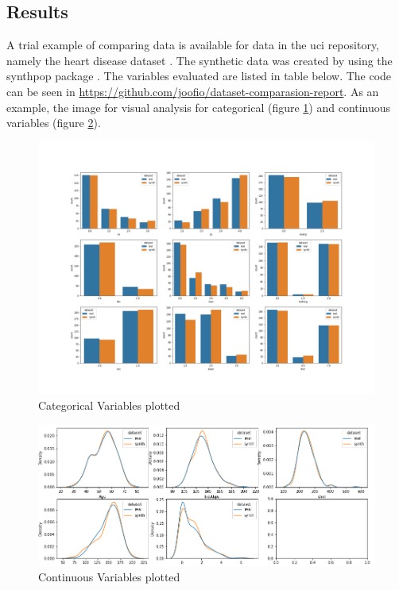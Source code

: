 \subsection{Results}
A trial example of comparing data is available for data in the \ac{uci} repository, namely the heart disease dataset \cite{misc_heart_disease_45}. The synthetic data was created by using the synthpop package \cite{synthpop}. The variables evaluated are listed in table below. The code can be seen in \url{https://github.com/joofio/dataset-comparasion-report}. As an example, the image for visual analysis for categorical (figure \ref{fig:catgorical}) and continuous variables (figure \ref{fig:continuous}).


\begin{figure}[H]
    \centering
    \includegraphics[scale=0.23]{figures/cat.png}
    \caption{Categorical Variables plotted}
    \label{fig:catgorical}
\end{figure}

\begin{figure}[t]
    \centering
    \includegraphics[width=\textwidth]{figures/continuous_plot_0.png}
    \caption{Continuous Variables plotted}
    \label{fig:continuous}
\end{figure}



